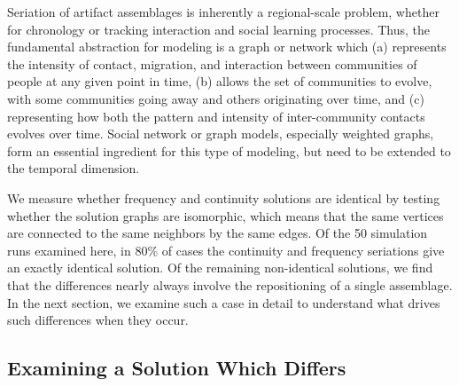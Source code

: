 Seriation of artifact assemblages is inherently a regional-scale
problem, whether for chronology or tracking interaction and social
learning processes. Thus, the fundamental abstraction for modeling is a
graph or network which (a) represents the intensity of contact,
migration, and interaction between communities of people at any given
point in time, (b) allows the set of communities to evolve, with some
communities going away and others originating over time, and (c)
representing how both the pattern and intensity of inter-community
contacts evolves over time. Social network or graph models, especially
weighted graphs, form an essential ingredient for this type of modeling,
but need to be extended to the temporal dimension.

We measure whether frequency and
continuity solutions are identical by testing whether the solution
graphs are isomorphic, which means that the same vertices are connected
to the same neighbors by the same edges. Of the 50 simulation runs
examined here, in 80\% of cases the continuity and frequency seriations
give an exactly identical solution. Of the remaining non-identical
solutions, we find that the differences nearly always involve the
repositioning of a single assemblage. In the next section, we examine
such a case in detail to understand what drives such differences when
they occur.

\subsection{Examining a Solution Which
Differs}\label{multser:sec:examining-a-solution-which-differs}


